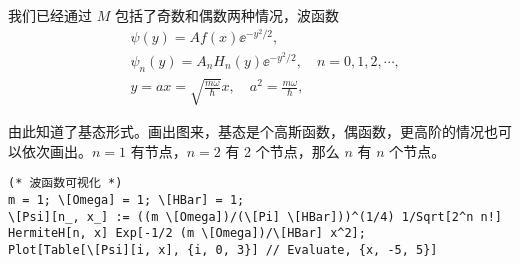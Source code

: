 我们已经通过 $M$ 包括了奇数和偶数两种情况，波函数
\begin{align}
    &\psi(y) = A f(x) \ee^{-y^2/2}, \\
    &\psi_n(y) = A_n H_n (y) \ee^{-y^2/2}, \quad n=0,1,2,\cdots, \\
    & y = ax = \sqrt{\frac{m\omega}{\hbar}} x, \quad a^2 = \frac{m\omega}\hbar,
\end{align}

由此知道了基态形式。画出图来，基态是个高斯函数，偶函数，更高阶的情况也可以依次画出。$n=1$ 有节点，$n=2$ 有 2 个节点，那么 $n$ 有 $n$ 个节点。
\begin{lstlisting}
(* 波函数可视化 *)
m = 1; \[Omega] = 1; \[HBar] = 1;
\[Psi][n_, x_] := ((m \[Omega])/(\[Pi] \[HBar]))^(1/4) 1/Sqrt[2^n n!]
HermiteH[n, x] Exp[-1/2 (m \[Omega])/\[HBar] x^2];
Plot[Table[\[Psi][i, x], {i, 0, 3}] // Evaluate, {x, -5, 5}]
\end{lstlisting}

